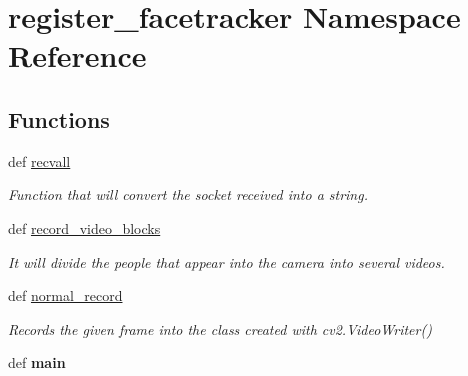 \hypertarget{namespaceregister__facetracker}{\section{register\-\_\-facetracker Namespace Reference}
\label{namespaceregister__facetracker}
}
\subsection*{Functions}
\begin{DoxyCompactItemize}
\item 
def \hyperlink{namespaceregister__facetracker_aa874007a5f9088e0820353516481d0a4}{recvall}
\begin{DoxyCompactList}\small\item\em Function that will convert the socket received into a string. \end{DoxyCompactList}\item 
def \hyperlink{namespaceregister__facetracker_a041788f3eaaea975c4c4617240033d5e}{record\-\_\-video\-\_\-blocks}
\begin{DoxyCompactList}\small\item\em It will divide the people that appear into the camera into several videos. \end{DoxyCompactList}\item 
def \hyperlink{namespaceregister__facetracker_a1c32488635611f9517c049fa7fc94b88}{normal\-\_\-record}
\begin{DoxyCompactList}\small\item\em Records the given frame into the class created with cv2.\-Video\-Writer() \end{DoxyCompactList}\item 
\hypertarget{namespaceregister__facetracker_a9c235bb1101995e8b08e45cf36f1683b}{def {\bfseries main}}\label{namespaceregister__facetracker_a9c235bb1101995e8b08e45cf36f1683b}

\end{DoxyCompactItemize}
